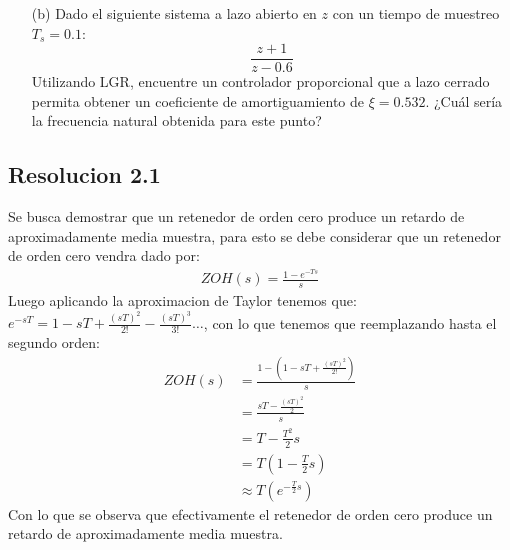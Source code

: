 \documentclass[
  11pt,
  letterpaper,
   addpoints,
  ]{exam}
\begin{document}
\begin{questions}
\begin{enumerate}
        \item[(b)] Dado el siguiente sistema a lazo abierto en \( z \) con un tiempo de muestreo \( T_s = 0.1 \):
        \[
        \frac{z + 1}{z - 0.6}
        \tag{1}
        \]
        Utilizando LGR, encuentre un controlador proporcional que a lazo cerrado permita obtener un coeficiente de amortiguamiento de \( \xi = 0.532 \). ¿Cuál sería la frecuencia natural obtenida para este punto?
    \end{enumerate}
\begin{solution}
\subsection*{Resolucion 2.1}
Se busca demostrar que un retenedor de orden cero produce un retardo de aproximadamente media muestra, para esto se debe considerar que un retenedor de orden cero vendra dado por:
\begin{align}
    ZOH(s)= \frac{1-e^{-Ts}}{s}
\end{align}
Luego aplicando la aproximacion de Taylor tenemos que: $e^{-sT}= 1 - sT + \frac{(sT)^{2}}{2!} - \frac{(sT)^{3}}{3!} \ldots $, con lo que tenemos que reemplazando hasta el segundo orden:
\begin{align}
    ZOH(s) &= \frac{1-(1-sT + \frac{(sT)^{2}}{2!})}{s}\\
    &= \frac{sT - \frac{(sT)^{2}}{2}}{s}\\
    &= T - \frac{T^{2}}{2}s\\
    &= T(1- \frac{T}{2}s)\\
    &\approx T(e^{-\frac{T}{2}s})
\end{align}
Con lo que se observa que efectivamente el retenedor de orden cero produce un retardo de aproximadamente media muestra.

\end{solution}
\end{questions}
\end{document}
